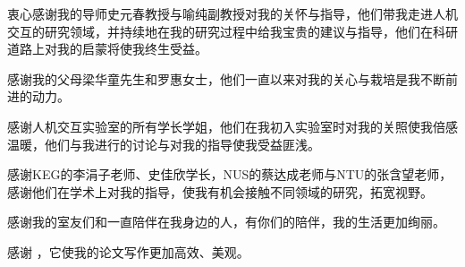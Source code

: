 \begin{acknowledgement}
  衷心感谢我的导师史元春教授与喻纯副教授对我的关怀与指导，他们带我走进人机交互的研究领域，并持续地在我的研究过程中给我宝贵的建议与指导，他们在科研道路上对我的启蒙将使我终生受益。
  
  感谢我的父母梁华童先生和罗惠女士，他们一直以来对我的关心与栽培是我不断前进的动力。
  
  感谢人机交互实验室的所有学长学姐，他们在我初入实验室时对我的关照使我倍感温暖，他们与我进行的讨论与对我的指导使我受益匪浅。
  
  感谢KEG的李涓子老师、史佳欣学长，NUS的蔡达成老师与NTU的张含望老师，感谢他们在学术上对我的指导，使我有机会接触不同领域的研究，拓宽视野。
  
  感谢我的室友们和一直陪伴在我身边的人，有你们的陪伴，我的生活更加绚丽。

  感谢 \thuthesis，它使我的论文写作更加高效、美观。
\end{acknowledgement}
